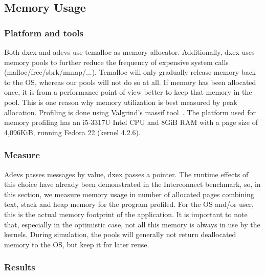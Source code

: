 \subsection{Memory Usage}
\subsubsection{Platform and tools}
Both dxex and adevs use tcmalloc as memory allocator. Additionally, dxex uses memory pools to further reduce the frequency of expensive system calls (malloc/free/sbrk/mmap/...). Tcmalloc will only gradually release memory back to the OS, whereas our pools will not do so at all. If memory has been allocated once, it is from a performance point of view better to keep that memory in the pool. This is one reason why memory utilization is best measured by peak allocation. Profiling is done using Valgrind's massif tool~\cite{Nethercote:2007:VFH:1273442.1250746}.
The platform used for memory profiling has an i5-3317U Intel CPU and 8GiB RAM with a page size of 4,096KiB, running Fedora 22 (kernel 4.2.6).
\subsubsection{Measure}
Adevs passes messages by value, dxex passes a pointer. The runtime effects of this choice have already been demonstrated in the Interconnect benchmark, so, in this section, we measure memory usage in number of allocated pages combining text, stack and heap memory for the program profiled. For the OS and/or user, this is the actual memory footprint of the application. It is important to note that, especially in the optimistic case, not all this memory is always in use by the kernels. During simulation, the pools will generally not return deallocated memory to the OS, but keep it for later reuse.
\subsubsection{Results}
